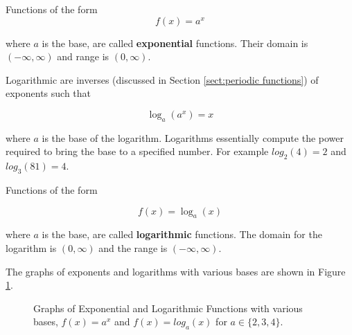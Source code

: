 \begin{definition}
    Functions of the form
    \begin{equation}
        f(x) = a^x
    \end{equation}

    where $a$ is the base, are called \textbf{exponential} functions. Their domain is $(-\infty,\infty)$ and range is $(0,\infty)$.
\end{definition}

Logarithmic are inverses (discussed in Section \ref{sect:periodic functions}) of exponents such that

\begin{equation}
    \log_a(a^x) = x
\end{equation}

\noindent where $a$ is the base of the logarithm. Logarithms essentially compute the power required to bring the base to a specified number. For example $log_2(4) = 2$ and $log_3(81) = 4$.

\begin{definition}
    Functions of the form

    \begin{equation}
        f(x) = \log_a(x)
    \end{equation}

    where $a$ is the base, are called \textbf{logarithmic} functions. The domain for the logarithm is $(0,\infty)$ and the range is $(-\infty,\infty)$.
\end{definition}

The graphs of exponents and logarithms with various bases are shown in Figure \ref{fig:exploggraphs}.

\medskip

\begin{figure}
    \centering
    \caption{Graphs of Exponential and Logarithmic Functions with various bases, $f(x) = a^x$ and $f(x) = log_a(x)$ for $a \in \{2,3,4\}$.}
    \label{fig:exploggraphs}
\end{figure}

